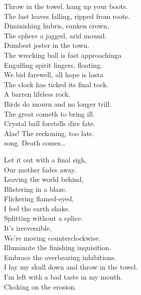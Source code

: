 Throw in the towel, hang up your boots. \\
The last leaves falling, ripped from roots. \\
Diminishing hubris, sunken crown, \\
The sphere a jagged, arid mound. \\
Dumbest jester in the town. \\

The wrecking ball is fast approachinga \\
Engulfing spirit lingers, floating. \\
We bid farewell, all hope is losta \\
The clock has ticked its final tock. \\
A barren lifeless rock. \\

Birds do mourn and no longer trill. \\
The great  cometh to bring ill. \\
Crystal ball foretells dire fate. \\
Alas! The reckoning, too late. \\

 song. Death comes… \\


Let it out with a final sigh, \\
Our mother fades away. \\
Leaving the world behind, \\
Blistering in a blaze. \\
Flickering flamed-eyed, \\
I feel the earth shake. \\
Splitting without a splice. \\
It's irreversible, \\
We're moving counterclockwise. \\

Illuminate the finishing inquisition. \\
Embrace the overbearing inhibitions. \\
I lay my skull down and throw in the towel. \\
I'm left with a bad taste in my mouth. \\
Choking on the  erosion. \\


